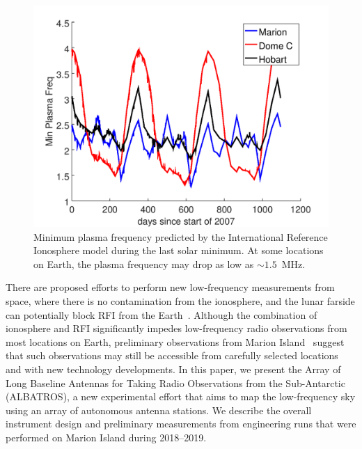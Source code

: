 \documentclass{ws-jai}
\def\albatros{ALBATROS}
\begin{document}
\begin{figure}
  \begin{center}
    \includegraphics[width=0.6\linewidth]{Figures/marion_domec_hobart.png}
    \caption{Minimum plasma frequency predicted by the International
      Reference Ionosphere model during the last solar minimum.  At
      some locations on Earth, the plasma frequency may drop as low as
      $\sim1.5$~MHz.}
    \label{Fig:iri}
  \end{center}
\end{figure}

There are proposed efforts to perform new low-frequency measurements
from space, where there is no contamination from the ionosphere, and
the lunar farside can potentially block RFI from the
Earth~\citep{2019arXiv190710853C, 2019arXiv190804296K}.  Although the
combination of ionosphere and RFI significantly impedes low-frequency
radio observations from most locations on Earth, preliminary
observations from Marion Island~\citep{2019JAI.....850004P} suggest
that such observations may still be accessible from carefully selected
locations and with new technology developments.  In this paper, we
present the Array of Long Baseline Antennas for Taking Radio
Observations from the Sub-Antarctic (\albatros), a new experimental
effort that aims to map the low-frequency sky using an array of
autonomous antenna stations.  We describe the overall instrument
design and preliminary measurements from engineering runs that were
performed on Marion Island during 2018--2019.
\end{document}
